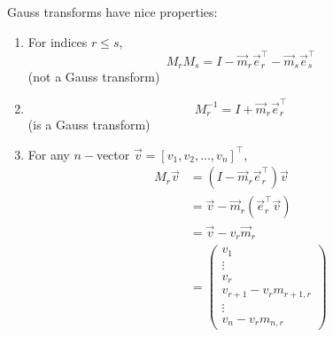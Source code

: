 \begin{note}
    Gauss transforms have nice properties:
    \begin{enumerate}
        \item For indices \( r \leq s \), \[
                  M_r M_s = I - \vec{m}_r \vec{e}_r^\top - \vec{m}_s \vec{e}_s^\top
              \] (not a Gauss transform)

        \item \[
                  M_r^{-1} = I + \vec{m}_r \vec{e}_r^\top
              \] (is a Gauss transform)

        \item For any \(n-\)vector \( \vec{v} = [v_1, v_2, \ldots, v_n]^\top \), \begin{align*}
                  M_r \vec{v}
                   &
                  = ( I - \vec{m}_r \vec{e}_r^\top) \vec{v}
                  \\
                   &
                  = \vec{v} - \vec{m}_r (\vec{e}_r^\top \vec{v})
                  \\
                   &
                  = \vec{v} - v_r \vec{m}_r
                  \\
                   &
                  = \begin{pmatrix}
                        v_1 \\ \vdots \\ v_{r} \\ v_{r+1} - v_r m_{r+1,r} \\ \vdots \\ v_n - v_r m_{n,r}
                    \end{pmatrix}
              \end{align*}
    \end{enumerate}
\end{note}

